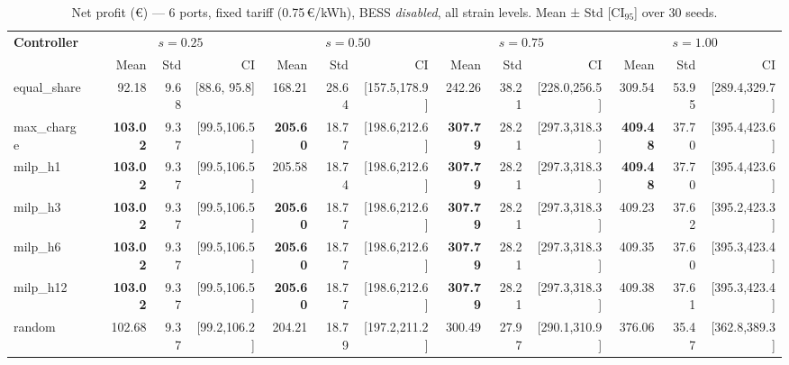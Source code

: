 \begin{table}[!htb]
\centering
\caption{Net profit (€) — 6 ports, fixed tariff (0.75\,€/kWh), BESS \emph{disabled},
         all strain levels. Mean ± Std [CI$_{95}$] over 30 seeds.}
\label{tab:gc_6port_fixed_nobess}
\setlength{\tabcolsep}{3pt}
\begin{tabular}{lp{1cm} rrr rrr rrr rrr}
\toprule
\textbf{Controller} & &
  \multicolumn{3}{c}{$s=0.25$} &
  \multicolumn{3}{c}{$s=0.50$} &
  \multicolumn{3}{c}{$s=0.75$} &
  \multicolumn{3}{c}{$s=1.00$} \\
\cmidrule(lr){3-5}\cmidrule(lr){6-8}\cmidrule(lr){9-11}\cmidrule(lr){12-14}
 & & Mean & Std & CI & Mean & Std & CI & Mean & Std & CI & Mean & Std & CI \\
\midrule
equal\_share & &  92.18 &  9.68 & [88.6, 95.8] & 168.21 & 28.64 & [157.5,178.9] & 242.26 & 38.21 & [228.0,256.5] & 309.54 & 53.95 & [289.4,329.7] \\
max\_charge  & & \textbf{103.02} &  9.37 & [99.5,106.5] & \textbf{205.60} & 18.77 & [198.6,212.6] & \textbf{307.79} & 28.21 & [297.3,318.3] & \textbf{409.48} & 37.70 & [395.4,423.6] \\
milp\_h1     & & \textbf{103.02} &  9.37 & [99.5,106.5] & 205.58 & 18.74 & [198.6,212.6] & \textbf{307.79} & 28.21 & [297.3,318.3] & \textbf{409.48} & 37.70 & [395.4,423.6] \\
milp\_h3     & & \textbf{103.02} &  9.37 & [99.5,106.5] & \textbf{205.60} & 18.77 & [198.6,212.6] & \textbf{307.79} & 28.21 & [297.3,318.3] & 409.23 & 37.62 & [395.2,423.3] \\
milp\_h6     & & \textbf{103.02} &  9.37 & [99.5,106.5] & \textbf{205.60} & 18.77 & [198.6,212.6] & \textbf{307.79} & 28.21 & [297.3,318.3] & 409.35 & 37.60 & [395.3,423.4] \\
milp\_h12    & & \textbf{103.02} &  9.37 & [99.5,106.5] & \textbf{205.60} & 18.77 & [198.6,212.6] & \textbf{307.79} & 28.21 & [297.3,318.3] & 409.38 & 37.61 & [395.3,423.4] \\
random       & & 102.68 &  9.37 & [99.2,106.2] & 204.21 & 18.79 & [197.2,211.2] & 300.49 & 27.97 & [290.1,310.9] & 376.06 & 35.47 & [362.8,389.3] \\
\bottomrule
\end{tabular}
\end{table}

